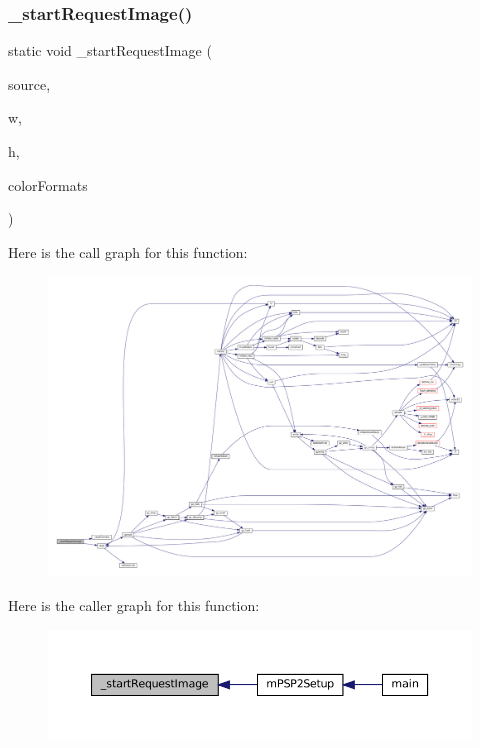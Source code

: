 \subsubsection{\texorpdfstring{\+\_\+start\+Request\+Image()}{\_startRequestImage()}}
{\footnotesize\ttfamily static void \+\_\+start\+Request\+Image (\begin{DoxyParamCaption}\item[{struct m\+Image\+Source $\ast$}]{source,  }\item[{unsigned}]{w,  }\item[{unsigned}]{h,  }\item[{\mbox{\hyperlink{ioapi_8h_a787fa3cf048117ba7123753c1e74fcd6}{int}}}]{color\+Formats }\end{DoxyParamCaption})\hspace{0.3cm}{\ttfamily [static]}}

Here is the call graph for this function\+:
\nopagebreak
\begin{figure}[H]
\begin{center}
\leavevmode
\includegraphics[width=350pt]{psp2-context_8c_a4623f2123706c3c47aeed159b0f08e58_cgraph}
\end{center}
\end{figure}
Here is the caller graph for this function\+:
\nopagebreak
\begin{figure}[H]
\begin{center}
\leavevmode
\includegraphics[width=350pt]{psp2-context_8c_a4623f2123706c3c47aeed159b0f08e58_icgraph}
\end{center}
\end{figure}
\mbox{\label{psp2-context_8c_af947cb220342f189826b8c971201d59b}} 
